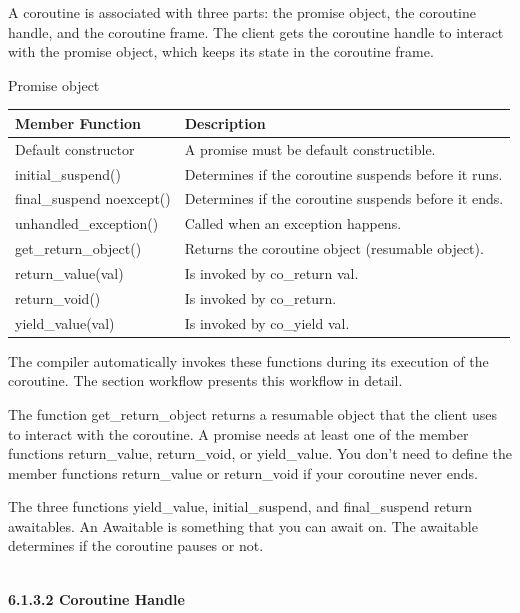 A coroutine is associated with three parts: the promise object, the coroutine handle, and the coroutine frame. The client gets the coroutine handle to interact with the promise object, which keeps its state in the coroutine frame.

\begin{center}
Promise object
\end{center}

\begin{table}[H]
\centering
\begin{tabular}{ll}
\textbf{Member Function}  & \textbf{Description}                                 \\ \hline
Default constructor       & A promise must be default constructible.             \\
initial\_suspend()        & Determines if the coroutine suspends before it runs. \\
final\_suspend noexcept() & Determines if the coroutine suspends before it ends. \\
unhandled\_exception()    & Called when an exception happens.                    \\
get\_return\_object()     & Returns the coroutine object (resumable object).     \\
return\_value(val)        & Is invoked by co\_return val.                        \\
return\_void()            & Is invoked by co\_return.                            \\
yield\_value(val)         & Is invoked by co\_yield val.                        
\end{tabular}
\end{table}

The compiler automatically invokes these functions during its execution of the coroutine. The section workflow presents this workflow in detail.

The function get\_return\_object returns a resumable object that the client uses to interact with the coroutine. A promise needs at least one of the member functions return\_value, return\_void, or yield\_value. You don’t need to define the member functions return\_value or return\_void if your coroutine never ends.

The three functions yield\_value, initial\_suspend, and final\_suspend return awaitables. An Awaitable is something that you can await on. The awaitable determines if the coroutine pauses or not.

\hspace*{\fill} \\ %
\noindent
\textbf{6.1.3.2\hspace{0.2cm} Coroutine Handle}

